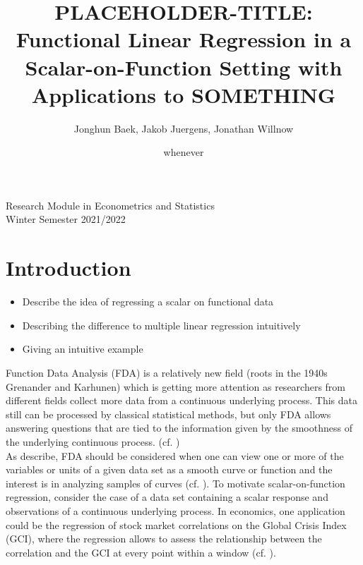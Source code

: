 \documentclass[11pt,twoside,a4paper]{article}
\begin{document}
	\title{{\LARGE {\color{red}PLACEHOLDER-TITLE:} Functional Linear Regression in a Scalar-on-Function Setting with Applications to SOMETHING}}
	\author{Jonghun Baek, Jakob Juergens, Jonathan Willnow}
	\date{{\color{red}whenever}}
	\maketitle
	\vspace{1.5 cm}
	\begin{center}
		Research Module in Econometrics and Statistics \\
		Winter Semester 2021/2022
	\end{center}
	
	\newpage
	
	\tableofcontents
	
	\newpage
	
	\section{Introduction}
	
	\begin{itemize}
		\item Describe the idea of regressing a scalar on functional data
		\item Describing the difference to multiple linear regression intuitively
		\item Giving an intuitive example
	\end{itemize}	
	Function Data Analysis (FDA) is a relatively new field {\color{red} (roots in the 1940s Grenander and Karhunen)} which is getting more attention as researchers from different fields collect more data from a continuous underlying process. This data still can be processed by classical statistical methods, but only FDA allows answering questions that are tied to the information given by the smoothness of the underlying continuous process. (cf. \cite{levitin_introduction_2007})\\
	 As \cite{kokoszka_introduction_2017} describe, FDA should be considered when one can view one or more of the variables or units of a given data set as a smooth curve or function and the interest is in analyzing samples of curves (cf. \cite[S.~17]{kokoszka_introduction_2017}).
	 To motivate scalar-on-function regression, consider the case of a data set containing a scalar response and observations of a continuous underlying process. In economics, one application could be the regression of stock market correlations on the Global Crisis Index (GCI), where the regression allows to assess the relationship between the correlation and the GCI at every point within a window (cf. \cite{Das_2019}). 
\end{document}
